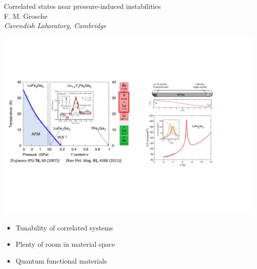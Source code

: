 
\begin{frame}[label=TitlePage]
\begin{center}
\textcolor[rgb]{0.2,0.2,0.7}{Correlated states near pressure-induced instabilities} \\
\vspace{0.5em}
{\footnotesize F. M. Grosche} \\
{\footnotesize \em Cavendish Laboratory, Cambridge} \\
\vspace{0.1em}
\end{center}
\vspace{0em}
\centerline{ \includegraphics[width=0.95\columnwidth]{IntroPicture}}


\begin{itemize}
\item Tunability of correlated systems
\item Plenty of room in material space
\item Quantum functional materials
\end{itemize}



\end{frame}
